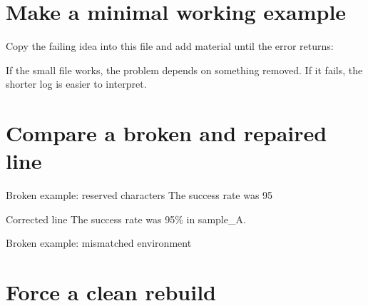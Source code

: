 \section{Make a minimal working example}

Copy the failing idea into this file and add material until the error returns:


If the small file works, the problem depends on something removed. If it fails,
the shorter log is easier to interpret.

\section{Compare a broken and repaired line}

\begin{latexcode}{Broken example: reserved characters}
The success rate was 95%
\end{latexcode}

\begin{latexcode}{Corrected line}
The success rate was 95\% in sample\_A.
\end{latexcode}

\begin{latexcode}{Broken example: mismatched environment}
\end{latexcode}

\section{Force a clean rebuild}

